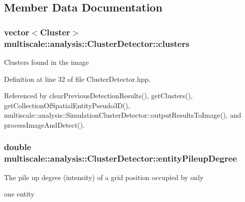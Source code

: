 \subsection{Member Data Documentation}
\hypertarget{classmultiscale_1_1analysis_1_1ClusterDetector_aa81a8649bc743389c2fc1919d47eb5b3}{
\subsubsection[{clusters}]{\setlength{\rightskip}{0pt plus 5cm}vector$<${\bf Cluster}$>$ multiscale\-::analysis\-::\-Cluster\-Detector\-::clusters\hspace{0.3cm}{\ttfamily [protected]}}}\label{classmultiscale_1_1analysis_1_1ClusterDetector_aa81a8649bc743389c2fc1919d47eb5b3}
Clusters found in the image 

Definition at line 32 of file Cluster\-Detector.\-hpp.



Referenced by clear\-Previous\-Detection\-Results(), get\-Clusters(), get\-Collection\-Of\-Spatial\-Entity\-Pseudo3\-D(), multiscale\-::analysis\-::\-Simulation\-Cluster\-Detector\-::output\-Results\-To\-Image(), and process\-Image\-And\-Detect().

\hypertarget{classmultiscale_1_1analysis_1_1ClusterDetector_aaa93a4b3a5a3c4279aa434669093ac40}{
\subsubsection[{entity\-Pileup\-Degree}]{\setlength{\rightskip}{0pt plus 5cm}double multiscale\-::analysis\-::\-Cluster\-Detector\-::entity\-Pileup\-Degree\hspace{0.3cm}{\ttfamily [protected]}}}\label{classmultiscale_1_1analysis_1_1ClusterDetector_aaa93a4b3a5a3c4279aa434669093ac40}
\begin{DoxyVerb}      The pile up degree (intensity) of a grid position occupied by only
\end{DoxyVerb}
 one entity 

